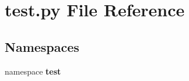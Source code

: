\section{test.py File Reference}
\label{test_8py}
\subsection*{Namespaces}
\begin{CompactItemize}
\item 
namespace {\bf test}
\end{CompactItemize}
